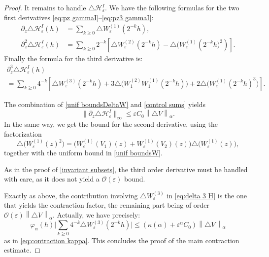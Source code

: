 \documentclass[10pt]{amsart}
\let\mathcal\mathscr
\newcommand{\cO}{\mathcal{O}}
\theoremstyle{plain}
\theoremstyle{definition}
\renewcommand{\H}{\mathcal{H}_\eps}
\let\eps\varepsilon
\let\ds\displaystyle
\newcommand{\bbabs}[1]{\biggl\lvert#1\biggr\rvert}
\newcommand{\nalph}[1]{\left\lVert#1\right\rVert_\alpha}
\newcommand{\vphia}{\varphi_\alpha}
\begin{document}
\begin{proof}
It remains to handle $\triangle \H^I$. We have the following formulas for the two first derivatives \eqref{eq:pz gammaI}--\eqref{eq:pz3 gammaI}:\vspace*{-3pt}
\begin{align*}
\partial_z \triangle \H^I (h) & = \sum_{k \geq 0} \triangle W_\eps^{(1)}(2^{-k}h), \\
\partial^2_z \triangle \H^I(h) & = \sum_{k\geq 0} 2^{-k} \left[\triangle W_\eps^{(2)}(2^{-k}h)-\triangle \bigl(W_\eps^{(1)}(2^{-k}h\bigr)^2) \right].
\end{align*}
Finally the formula for the third derivative is:\vspace*{-3pt}
\begin{multline}\label{eq:delta 3 H}
\ds \partial^3_z \triangle \H^I(h)\\
= \ds \sum_{k \geq 0} 4^{-k} \left[\triangle W_\eps^{(3)}(2^{-k}h)+3 \triangle \bigl (W_1^{(2)}W_1^{(1)}(2^{-k}h) \bigr) +2 \triangle \bigl (W_\eps^{(1)}(2^{-k}h)^3 \bigr) \right].	
\end{multline}

The combination of \cref{unif boundsDeltaW} and \cref{control sums} yields
\begin{equation*}
\|\partial_z \triangle \H^I\|_{\infty} \leq \eps C_0 \nalph{\triangle V}.
\end{equation*}
In the same way, we get the bound for the second derivative, using the factorization
\begin{equation*}
\triangle \bigl (W_\eps^{(1)}(z)^2 \bigr) = \bigl (W_\eps^{(1)}(V_1)(z) + W_\eps^{(1)}(V_2)(z) \bigr) \triangle \bigl (W_\eps^{(1)}(z) \bigr),
\end{equation*}
together with the uniform bound in \cref{unif boundsW}.

As in the proof of \cref{invariant subsets}, the third order derivative must be handled with care, as it does not yield a $\cO(\eps)$ bound.

Exactly as above, the contribution involving $\triangle W_\eps^{(3)}$ in \eqref{eq:delta 3 H} is the one that yields the contraction factor, the remaining part being of order $\cO(\eps) \nalph{\triangle V}$. Actually, we have precisely:
\begin{equation*}
\vphia(h) \ds \bbabs{ \sum_{k\geq 0} 4^{-k} \triangle W_\eps^{(3)} (2^{-k}h)} \leq \left(\kappa(\alpha) + \eps^\alpha C_0 \right) \nalph{\triangle V}
\end{equation*}
as in \eqref{eq:contraction kappa}. This concludes the proof of the main contraction estimate.
\end{proof}
\end{document}
